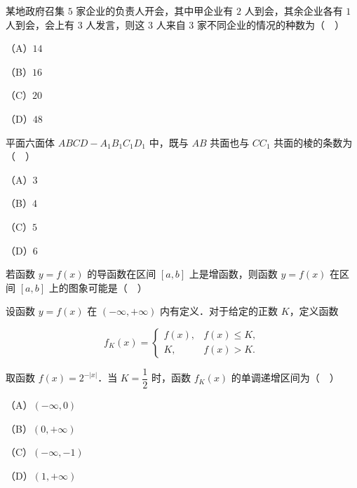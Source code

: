 \endgroup
\begin{question}
某地政府召集 $5$ 家企业的负责人开会，其中甲企业有 $2$ 人到会，其余企业各有 $1$ 人到会，会上有 $3$ 人发言，则这 $3$ 人来自 $3$ 家不同企业的情况的种数为（　）

（A）$14$

（B）$16$

（C）$20$

（D）$48$

\end{question}
\begin{question}
平面六面体 $ABCD-A_1B_1C_1D_1$ 中，既与 $AB$ 共面也与 $CC_1$ 共面的棱的条数为（　）

（A）$3$

（B）$4$

（C）$5$

（D）$6$

\Needspace{0.4\textheight}
\end{question}
\begingroup
\renewenvironment{question}{\Needspace{0.5\textheight}}{}
\begin{question}
若函数 $y=f(x)$ 的导函数在区间 $[a,b]$ 上是增函数，则函数 $y=f(x)$ 在区间 $[a,b]$ 上的图象可能是（　）
\nopagebreak[4]
\begin{center}\end{center}
\nopagebreak[4]
\end{question}
\endgroup
\begin{question}
设函数 $y=f(x)$ 在 $(-\infty,+\infty)$ 内有定义．对于给定的正数 $K$，定义函数

\nopagebreak[4]
\[f_K(x)=\begin{cases}f(x), & f(x)\leqslant K,\\ K, & f(x)>K.\end{cases}\]

取函数 $f(x)=2^{-|x|}$．当 $K=\dfrac12$ 时，函数 $f_K(x)$ 的单调递增区间为（　）

（A）$(-\infty,0)$

（B）$(0,+\infty)$

（C）$(-\infty,-1)$

（D）$(1,+\infty)$

\end{question}

